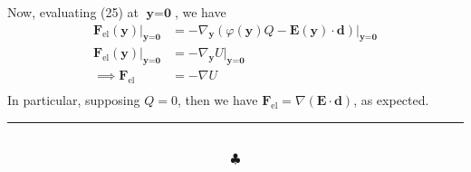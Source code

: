 \documentclass[]{article}
\begin{document}
Now, evaluating (25) at $\textbf{y} = \textbf{0}$, we have
\begin{equation}
\begin{split}
\textbf{F}_{\text{el}}(\textbf{y}) \Big|_{\textbf{y}=\textbf{0}} & = - \nabla_\textbf{y} \left(  \varphi(\textbf{y})Q -  \textbf{E}(\textbf{y} ) \cdot \textbf{d} \right) \Big|_{\textbf{y}=\textbf{0}} \\
\textbf{F}_{\text{el}}(\textbf{y}) \Big|_{\textbf{y}=\textbf{0}} & = -  \nabla_\textbf{y} U  \Big|_{\textbf{y}=\textbf{0}} \\ 
\implies \textbf{F}_{\text{el}} & = -  \nabla U  \\
\end{split}
\end{equation}
In particular, supposing $Q=0$, then we have $\textbf{F}_{\text{el}}= \nabla \left(  \textbf{E}\cdot\textbf{d}\right)$, as expected.  \\
\noindent\rule{15cm}{0.4pt} \\
$$\clubsuit$$
\end{document}
